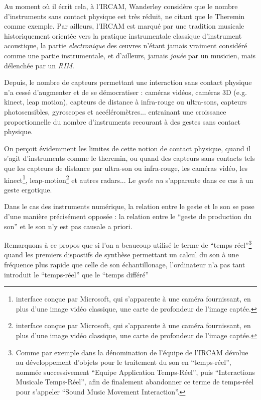 Au moment où il écrit cela, à l'IRCAM, Wanderley considère que le nombre d'instruments sans contact physique est très réduit, ne citant que le Theremin comme exemple. Par ailleurs, l'IRCAM est marqué par une tradition musicale historiquement orientée vers la pratique instrumentale classique d'instrument acoustique, la partie \textit{electronique} des œuvres n'étant jamais vraiment considéré comme une partie instrumentale, et d'ailleurs, jamais \textit{jouée} par un musicien, mais délenchée par un \textit{\gls{RIM}}.


Depuis, le nombre de capteurs permettant une interaction sans contact physique n'a cessé d'augmenter et de se démocratiser : caméras vidéos, caméras 3D (e.g. kinect, leap motion), capteurs de distance à infra-rouge ou ultra-sons, capteurs photosensibles, gyroscopes et accéléromètres... entrainant une croissance proportionnelle du nombre d'instruments recourant à des gestes sans contact physique.

On perçoit évidemment les limites de cette notion de contact physique, quand il s'agit d'instruments comme le theremin, ou quand des capteurs sans contacts tels que les capteurs de distance par ultra-son ou infra-rouge, les caméras vidéo, les kinect\footnote{interface conçue par Microsoft, qui s'apparente à une caméra fournissant, en plus d'une image vidéo classique, une carte de profondeur de l'image captée.}, leap-motion\footnote{interface conçue par Microsoft, qui s'apparente à une caméra fournissant, en plus d'une image vidéo classique, une carte de profondeur de l'image captée.} et autres radars... Le \textit{geste nu} s'apparente dans ce cas à un geste ergotique.

Dans le cas des instruments numérique, la relation entre le geste et le son se pose d'une manière précisément opposée : la relation entre le ``geste de production du son'' et le son n'y est pas causale a priori.

Remarquons à ce propos que si l'on a beaucoup utilisé le terme de ``temps-réel''\footnote{Comme par exemple dans la dénomination de l'équipe de l'IRCAM dévolue au développement d'objets pour le traitement du son en ``temps-réel'', nommée successivement ``Equipe Application Temps-Réel'', puis ``Interactions Musicale Temps-Réel'', afin de finalement abandonner ce terme de temps-réel pour s'appeler ``Sound Music Movement Interaction''.} quand les premiers dispostifs de synthèse permettant un calcul du son à une fréquence plus rapide que celle de son échantillonage, l'ordinateur n'a pas tant introduit le ``temps-réel'' que le ``temps différé''

